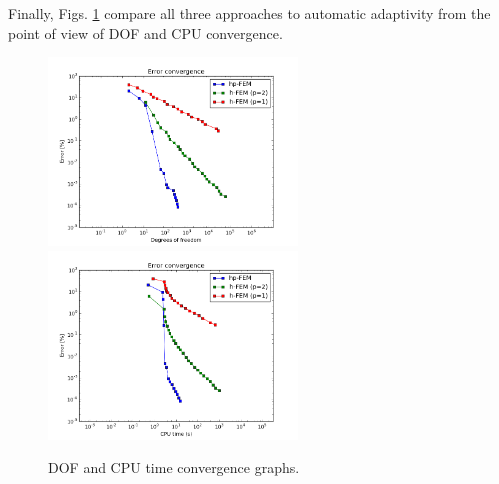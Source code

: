Finally, Figs. \ref{fig:nist-10-conv} compare all
three approaches to automatic adaptivity from the point
of view of DOF and CPU convergence.

\begin{figure}[!ht]
\centering
\includegraphics[height=5cm]{nist/nist-10/conv_dof_aniso.png}\ \
\includegraphics[height=5cm]{nist/nist-10/conv_cpu_aniso.png}
\caption{DOF and CPU time convergence graphs.}
\label{fig:nist-10-conv}
\end{figure}

